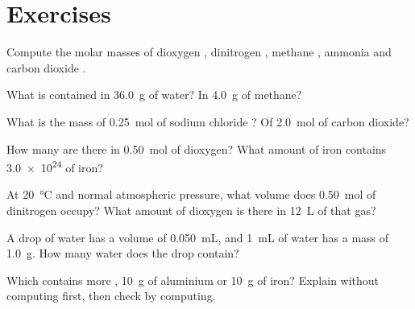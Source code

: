 \section{Exercises}

\begin{exercise}[$\star$]\label{exo:g10:the-mole:1}
Compute the molar masses of dioxygen , dinitrogen ,
methane , ammonia  and carbon dioxide .
\end{exercise}

\begin{exercise}[$\star$]\label{exo:g10:the-mole:2}
What  is contained in \qty{36.0}{g} of water? In
\qty{4.0}{g} of methane?
\end{exercise}

\begin{exercise}[$\star$]\label{exo:g10:the-mole:3}
What is the mass of \qty{0.25}{mol} of sodium chloride ? Of
\qty{2.0}{mol} of carbon dioxide?
\end{exercise}

\begin{exercise}[$\star$]\label{exo:g10:the-mole:4}
How many  are there in \qty{0.50}{mol} of dioxygen? What amount
of iron contains \num{3.0e24}  of iron?
\end{exercise}

\begin{exercise}[$\star$]\label{exo:g10:the-mole:5}
At \qty{20}{\celsius} and normal atmospheric pressure, what volume does
\qty{0.50}{mol} of dinitrogen occupy? What amount of dioxygen is there in
\qty{12}{L} of that gas?
\end{exercise}

\begin{exercise}[$\star\star$]\label{exo:g10:the-mole:6}
A drop of water has a volume of \qty{0.050}{mL}, and \qty{1}{mL} of water
has a mass of \qty{1.0}{g}. How many water  does the drop
contain?
\end{exercise}

\begin{exercise}[$\star\star$]\label{exo:g10:the-mole:7}
Which contains more , \qty{10}{g} of aluminium or \qty{10}{g} of
iron? Explain without computing first, then check by computing.
\end{exercise}

